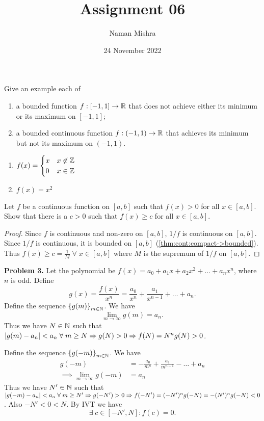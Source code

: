 \documentclass[12pt]{article}
\title{Assignment 06}
\author{Naman Mishra}
\date{24 November 2022}
\begin{document}
\maketitle

\begin{problem}
    Give an example each of
    \begin{enumerate}[label=(\alph*)]
        \item a bounded function $f : [-1, 1] \to \mathbb{R}$ that does not achieve either its minimum or its maximum on $[-1, 1]$;
        \item a bounded continuous function $f : (-1, 1) \to \mathbb{R}$ that achieves its minimum but not its maximum on $(-1, 1)$.
    \end{enumerate}
\end{problem}
\begin{enumerate}[label=(\alph*)]
    \item $f(x) =
        \begin{cases}
            x & x \not\in \mathbb{Z} \\
            0 & x \in \mathbb{Z}
        \end{cases}$
    \item $f(x) = x^{2}$ \qedhere
\end{enumerate}

\begin{problem}
    Let $f$ be a continuous function on $[a, b]$ such that $f(x) > 0$ for all $x \in [a, b]$.
    Show that there is a $c > 0$ such that $f(x) \geq c$ for all $x \in [a, b]$.
\end{problem}
\begin{proof}
    Since $f$ is continuous and non-zero on $[a, b]$, $1 / f$ is continuous on $[a, b]$.
    Since $1 / f$ is continuous, it is bounded on $[a, b]$ (\cref{thm:cont:compact->bounded}).
    Thus $f(x) \geq c = \frac{1}{M} \;\forall\; x \in [a, b]$ where $M$ is the supremum of $1 / f$ on $[a, b]$.
\end{proof}

\textbf{Problem 3.}
Let the polynomial be $f(x) = a_{0} + a_{1}x + a_{2}x^{2} + \dots + a_{n}x^{n}$, where $n$ is odd. Define \[
    g(x) = \frac{f(x)}{x^{n}} = \frac{a_{0}}{x^{n}} + \frac{a_{1}}{x^{n-1}} + \dots + a_{n}.
\] Define the sequence $\set{g(m)}_{m \in \N}$. We have \[
    \lim_{m \to \infty} g(m) = a_{n}.
\] Thus we have $N \in \mathbb{N}$ such that $\abs{ g(m) - a_{n} } < a_{n} \;\forall\; m \geq N \implies g(N) > 0 \implies f(N) = N^{n} g(N) > 0$. 

Define the sequence $\set{g(-m)}_{m \in \N}$. We have
\begin{align*}
    g(-m) &= -\frac{a_{0}}{m^{n}} + \frac{a_{1}}{m^{n-1}} - \dots + a_{n} \\
    \implies \lim_{m \to \infty} g(-m) &= a_{n}
\end{align*}
Thus we have $N' \in \mathbb{N}$ such that $\abs{ g(-m) - a_{n} } < a_{n} \;\forall\; m \geq N' \implies g(-N') > 0 \implies f(-N') = (-N')^{n} g(-N) = - (N')^{n} g(-N) < 0$. Also $-N' < 0 < N$. By IVT we have \[
    \exists\; c \in [-N', N] : f(c) = 0.
\]
\end{document}
